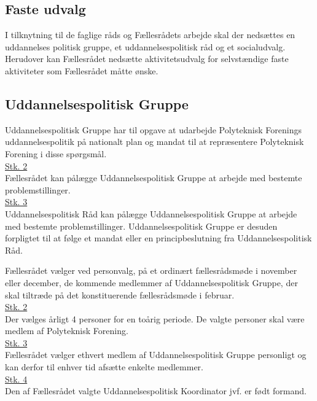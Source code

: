 \begin{list}
\subsection{Faste udvalg}
\item I tilknytning til de faglige råds og Fællesrådets arbejde skal der nedsættes en uddannelses politisk gruppe, et uddannelsespolitisk råd og et socialudvalg. Herudover kan Fællesrådet nedsætte aktivitetsudvalg for selvstændige faste aktiviteter som Fællesrådet måtte ønske.\\

\subsection{Uddannelsespolitisk Gruppe}
\item Uddannelsespolitisk Gruppe har til opgave at udarbejde Polyteknisk Forenings uddannelsespolitik på nationalt plan og mandat til at repræsentere Polyteknisk Forening i disse spørgsmål.\\

\underline{Stk. 2}\\
Fællesrådet kan pålægge Uddannelsespolitisk Gruppe at arbejde med bestemte problemstillinger.\\

\underline{Stk. 3}\\
Uddannelsespolitisk Råd kan pålægge Uddannelsespolitisk Gruppe at arbejde med bestemte problemstillinger. Uddannelsespolitisk Gruppe er desuden forpligtet til at følge et mandat eller en
principbeslutning fra Uddannelsespolitisk Råd.\\

\item Fællesrådet vælger ved personvalg, på et ordinært fællesrådsmøde i november eller december, de kommende medlemmer af Uddannelsespolitisk Gruppe, der skal tiltræde på det konstituerende fællesrådsmøde i februar.\\

\underline{Stk. 2}\\
Der vælges årligt 4 personer for en toårig periode. De valgte personer skal være medlem af Polyteknisk Forening.\\

\underline{Stk. 3}\\ Fællesrådet vælger ethvert medlem af Uddannelsespolitisk Gruppe personligt og kan derfor til enhver tid afsætte enkelte medlemmer.\\

\underline{Stk. 4}\\ 
Den af Fællesrådet valgte Uddannelsespolitisk Koordinator jvf.  er født formand.\\


\end{list}
